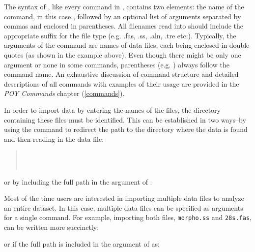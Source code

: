 {The syntax of , like every command in \poy, contains two elements: the name of the command, 
in this case , followed by an optional list of arguments separated by commas and enclosed in 
parentheses. All filenames read into \poy should include the appropriate suffix for the file type (e.g. .fas, .ss, .aln, .tre etc:).  
Typically, the arguments of the command  are names of data files, each being enclosed in double 
quotes (as shown in the example above). Even though there might be only one argument or none in some commands, 
parentheses (e.g. ) always follow the command name. An exhaustive discussion of \poy command 
structure and detailed descriptions of all commands with examples of their usage are provided in the \emph{POY Commands} 
chapter (\ref{commands}).

In order to import data by entering the names of the files, the directory containing these files must be identified.  
This can be established in two ways--by using the command  to redirect the path to the directory 
where the data is found and then reading in the data file:\\
\begin{quote}
\\
\\
\end{quote}
or by including the full path in the argument of :\\
\begin{quote}
\end{quote}

Most of the time users are interested in importing multiple data files to analyze an entire dataset. In this case, multiple data 
files can be specified as arguments for a single command. For example, importing both files, \texttt{morpho.ss} and 
\texttt{28s.fas}, can be written more succinctly:\\
\begin{quote}
\end{quote}
or if the full path is included in the argument of  as: \\

\begin{quote}
\end{quote}

}
